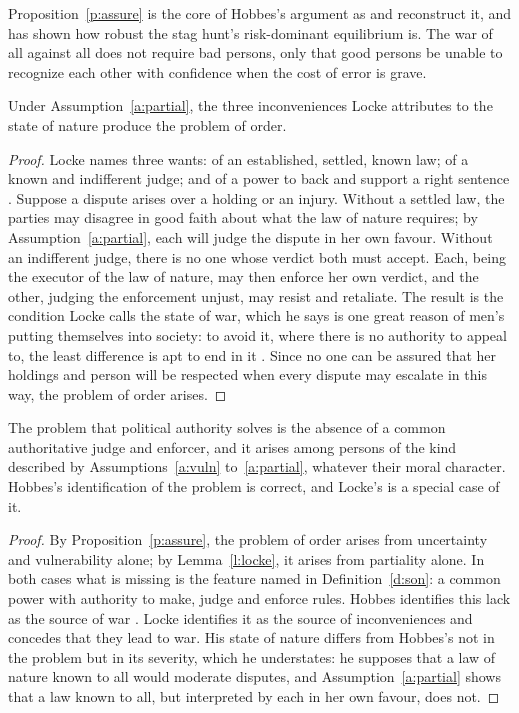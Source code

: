 \documentclass{situationist-preprint}
\begin{document}
Proposition~\ref{p:assure} is the core of Hobbes's argument as \citet{Kavka1986} and \citet{Hampton1986} reconstruct it, and \citet{Skyrms2004} has shown how robust the stag hunt's risk-dominant equilibrium is. The war of all against all does not require bad persons, only that good persons be unable to recognize each other with confidence when the cost of error is grave.

\begin{lemma}\label{l:locke}
Under Assumption~\ref{a:partial}, the three inconveniences Locke attributes to the state of nature produce the problem of order.
\end{lemma}

\begin{proof}
Locke names three wants: of an established, settled, known law; of a known and indifferent judge; and of a power to back and support a right sentence \citep[\S\S 124--126]{Locke1689}. Suppose a dispute arises over a holding or an injury. Without a settled law, the parties may disagree in good faith about what the law of nature requires; by Assumption~\ref{a:partial}, each will judge the dispute in her own favour. Without an indifferent judge, there is no one whose verdict both must accept. Each, being the executor of the law of nature, may then enforce her own verdict, and the other, judging the enforcement unjust, may resist and retaliate. The result is the condition Locke calls the state of war, which he says is one great reason of men's putting themselves into society: to avoid it, where there is no authority to appeal to, the least difference is apt to end in it \citep[\S 21]{Locke1689}. Since no one can be assured that her holdings and person will be respected when every dispute may escalate in this way, the problem of order arises.
\end{proof}

\begin{theorem}\label{t:problem}
The problem that political authority solves is the absence of a common authoritative judge and enforcer, and it arises among persons of the kind described by Assumptions~\ref{a:vuln} to~\ref{a:partial}, whatever their moral character. Hobbes's identification of the problem is correct, and Locke's is a special case of it.
\end{theorem}

\begin{proof}
By Proposition~\ref{p:assure}, the problem of order arises from uncertainty and vulnerability alone; by Lemma~\ref{l:locke}, it arises from partiality alone. In both cases what is missing is the feature named in Definition~\ref{d:son}: a common power with authority to make, judge and enforce rules. Hobbes identifies this lack as the source of war \citep[ch.~13]{Hobbes1651}. Locke identifies it as the source of inconveniences and concedes that they lead to war. His state of nature differs from Hobbes's not in the problem but in its severity, which he understates: he supposes that a law of nature known to all would moderate disputes, and Assumption~\ref{a:partial} shows that a law known to all, but interpreted by each in her own favour, does not.
\end{proof}
\end{document}
